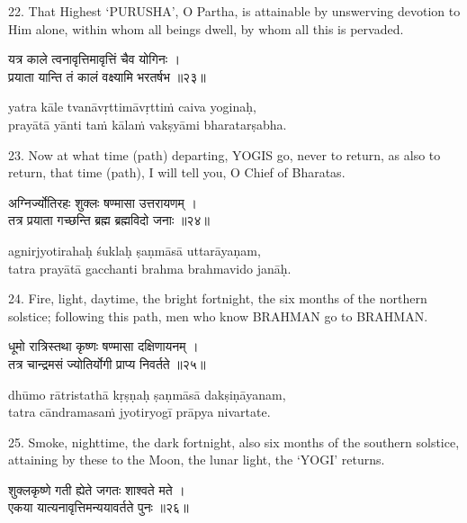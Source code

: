22. That Highest `PURUSHA', O Partha, is attainable by unswerving devotion to
Him alone, within whom all beings dwell, by whom all this is pervaded.

\begin{gitaverse}
यत्र काले त्वनावृत्तिमावृत्तिं चैव योगिनः । \\
प्रयाता यान्ति तं कालं वक्ष्यामि भरतर्षभ ॥२३॥
\end{gitaverse}

\begin{transliteration}
yatra kāle tvanāvṛttimāvṛttiṁ caiva yoginaḥ, \\
prayātā yānti taṁ kālaṁ vakṣyāmi bharatarṣabha.
\end{transliteration}

23. Now at what time (path) departing, YOGIS go, never to return, as also to
return, that time (path), I will tell you, O Chief of Bharatas.

\begin{gitaverse}
अग्निर्ज्योतिरहः शुक्लः षण्मासा उत्तरायणम् । \\
तत्र प्रयाता गच्छन्ति ब्रह्म ब्रह्मविदो जनाः ॥२४॥
\end{gitaverse}

\begin{transliteration}
agnirjyotirahaḥ śuklaḥ ṣaṇmāsā uttarāyaṇam, \\
tatra prayātā gacchanti brahma brahmavido janāḥ.
\end{transliteration}

24. Fire, light, daytime, the bright fortnight, the six months of the northern
solstice; following this path, men who know BRAHMAN go to BRAHMAN.\@

\begin{gitaverse}
धूमो रात्रिस्तथा कृष्णः षण्मासा दक्षिणायनम् । \\
तत्र चान्द्रमसं ज्योतिर्योगी प्राप्य निवर्तते ॥२५॥
\end{gitaverse}

\begin{transliteration}
dhūmo rātristathā kṛṣṇaḥ ṣaṇmāsā dakṣiṇāyanam, \\
tatra cāndramasaṁ jyotiryogī prāpya nivartate.
\end{transliteration}

25. Smoke, nighttime, the dark fortnight, also six months of the southern
solstice, attaining by these to the Moon, the lunar light, the `YOGI' returns.

\begin{gitaverse}
शुक्लकृष्णे गती ह्येते जगतः शाश्वते मते । \\
एकया यात्यनावृत्तिमन्ययावर्तते पुनः ॥२६॥
\end{gitaverse}

